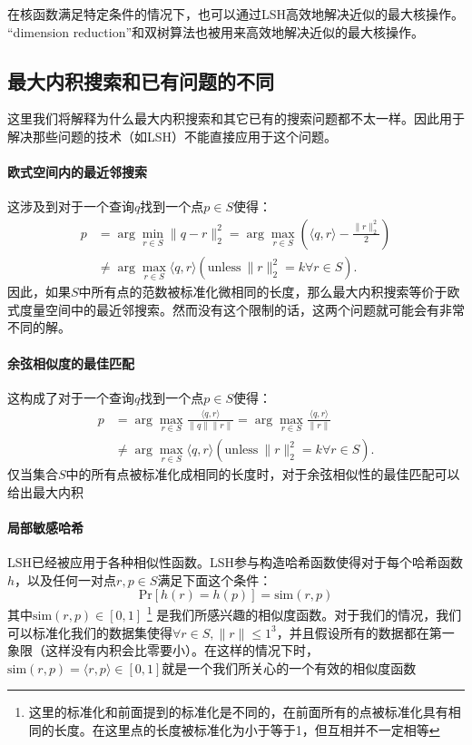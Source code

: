 \documentclass[twocolumn]{article}
\begin{document}
在核函数满足特定条件的情况下，也可以通过LSH高效地解决近似的最大核操作。 “dimension reduction”和双树算法也被用来高效地解决近似的最大核操作。

\subsection{最大内积搜索和已有问题的不同}
这里我们将解释为什么最大内积搜索和其它已有的搜索问题都不太一样。因此用于解决那些问题的技术（如LSH）不能直接应用于这个问题。

\paragraph{欧式空间内的最近邻搜索}这涉及到对于一个查询$q$找到一个点$p \in S$使得：
\begin{align*}
p &= \arg \min_{r \in S}\|q - r\|^2_2 = \arg \max_{r \in S}\left(\langle q,r \rangle - \frac{\|r\|_2^2}{2}\right) \\
  &  \neq \arg \max_{r \in S} \langle q,r \rangle (\mathrm{unless}\ \|r\|_2^2 = k \forall r \in S).
\end{align*}
因此，如果$S$中所有点的范数被标准化微相同的长度，那么最大内积搜索等价于欧式度量空间中的最近邻搜索。然而没有这个限制的话，这两个问题就可能会有非常不同的解。

\paragraph{余弦相似度的最佳匹配}这构成了对于一个查询$q$找到一个点$p \in S$使得：
\begin{align*}
p &= \arg \max_{r \in S} \frac{\langle q,r \rangle}{\|q\|\|r\|} = \arg \max_{r \in S} \frac{\langle q,r \rangle}{\|r\|} \\
    &\neq \arg \max_{r \in S} \langle q,r \rangle (\mathrm{unless}\ \|r\|_2^2 = k \forall r \in S).
\end{align*}
仅当集合$S$中的所有点被标准化成相同的长度时，对于余弦相似性的最佳匹配可以给出最大内积

\paragraph{局部敏感哈希}LSH已经被应用于各种相似性函数。LSH参与构造哈希函数使得对于每个哈希函数$h$，以及任何一对点$r,p \in S$满足下面这个条件：
\begin{equation}
\mathrm{Pr}[h(r) = h(p)] = \mathrm{sim}(r,p)
\end{equation}
其中$\mathrm{sim}(r,p) \in [0,1]$
\footnote{这里的标准化和前面提到的标准化是不同的，在前面所有的点被标准化具有相同的长度。在这里点的长度被标准化为小于等于1，但互相并不一定相等}
是我们所感兴趣的相似度函数。对于我们的情况，我们可以标准化我们的数据集使得$\forall r \in S, \|r\| \le 1^3$，并且假设所有的数据都在第一象限（这样没有内积会比零要小）。在这样的情况下时，$\mathrm{sim}(r,p) = \langle r,p \rangle \in [0,1]$就是一个我们所关心的一个有效的相似度函数
\end{document}
